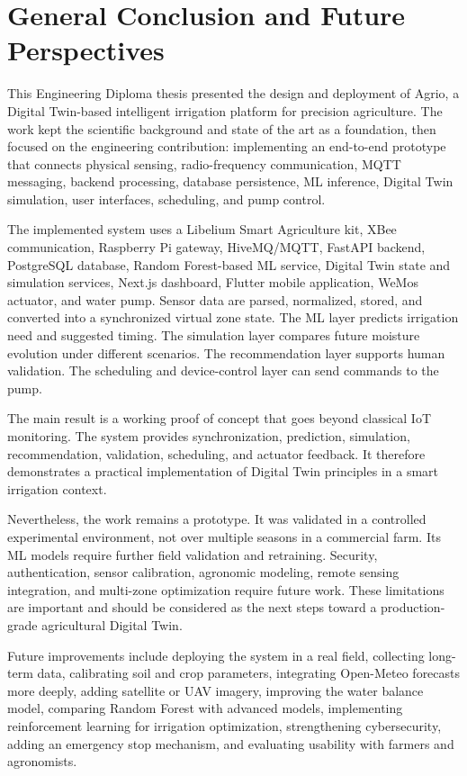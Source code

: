 \chapter*{General Conclusion and Future Perspectives}

This Engineering Diploma thesis presented the design and deployment of Agrio, a Digital Twin-based intelligent irrigation platform for precision agriculture. The work kept the scientific background and state of the art as a foundation, then focused on the engineering contribution: implementing an end-to-end prototype that connects physical sensing, radio-frequency communication, MQTT messaging, backend processing, database persistence, ML inference, Digital Twin simulation, user interfaces, scheduling, and pump control.

The implemented system uses a Libelium Smart Agriculture kit, XBee communication, Raspberry Pi gateway, HiveMQ/MQTT, FastAPI backend, PostgreSQL database, Random Forest-based ML service, Digital Twin state and simulation services, Next.js dashboard, Flutter mobile application, WeMos actuator, and water pump. Sensor data are parsed, normalized, stored, and converted into a synchronized virtual zone state. The ML layer predicts irrigation need and suggested timing. The simulation layer compares future moisture evolution under different scenarios. The recommendation layer supports human validation. The scheduling and device-control layer can send commands to the pump.

The main result is a working proof of concept that goes beyond classical IoT monitoring. The system provides synchronization, prediction, simulation, recommendation, validation, scheduling, and actuator feedback. It therefore demonstrates a practical implementation of Digital Twin principles in a smart irrigation context.

Nevertheless, the work remains a prototype. It was validated in a controlled experimental environment, not over multiple seasons in a commercial farm. Its ML models require further field validation and retraining. Security, authentication, sensor calibration, agronomic modeling, remote sensing integration, and multi-zone optimization require future work. These limitations are important and should be considered as the next steps toward a production-grade agricultural Digital Twin.

Future improvements include deploying the system in a real field, collecting long-term data, calibrating soil and crop parameters, integrating Open-Meteo forecasts more deeply, adding satellite or UAV imagery, improving the water balance model, comparing Random Forest with advanced models, implementing reinforcement learning for irrigation optimization, strengthening cybersecurity, adding an emergency stop mechanism, and evaluating usability with farmers and agronomists.
